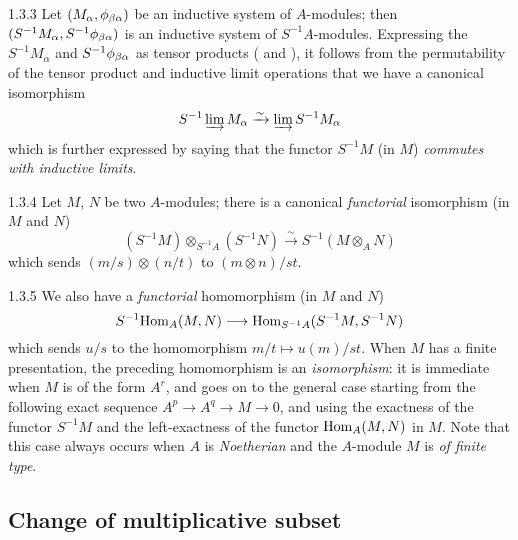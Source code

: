 \documentclass[10pt,oneside]{book}
\begin{document}
\begin{env}{1.3.3}
\label{env-0.1.3.3}
Let $(M_\alpha,\phi_{\beta\alpha})$ be an inductive system of $A$-modules; then
$(S^{-1}M_\alpha,S^{-1}\phi_{\beta\alpha})$ is an inductive system of $S^{-1}A$-modules.
Expressing the $S^{-1}M_\alpha$ and $S^{-1}\phi_{\beta\alpha}$ as tensor products
( and ), it follows from the permutability of the tensor product and
inductive limit operations that we have a canonical isomorphism
\[
  S^{-1}\varinjlim M_\alpha\xrightarrow{\sim}\varinjlim S^{-1}M_\alpha
\]
which is further expressed by saying that the functor $S^{-1}M$ (in $M$) \emph{commutes with
inductive limits}.
\end{env}

\begin{env}{1.3.4}
\label{env-0.1.3.4}
Let $M$, $N$ be two $A$-modules; there is a canonical \emph{functorial} isomorphism (in $M$
and $N$)
\[
  (S^{-1}M)\otimes_{S^{-1}A}(S^{-1}N)\xrightarrow{\sim}S^{-1}(M\otimes_A N)
\]
which sends $(m/s)\otimes(n/t)$ to $(m\otimes n)/st$.
\end{env}

\begin{env}{1.3.5}
\label{env-0.1.3.5}
We also have a \emph{functorial} homomorphism (in $M$ and $N$)
\[
  S^{-1}{\mathop{\mathrm{Hom}}\nolimits}_A(M,N)\longrightarrow{\mathop{\mathrm{Hom}}\nolimits}_{S^{-1}A}(S^{-1}M,S^{-1}N)
\]
which sends $u/s$ to the homomorphism $m/t\mapsto u(m)/st$. When $M$ has a finite
presentation, the preceding homomorphism is an \emph{isomorphism}: it is immediate when $M$
is of the form $A^r$, and goes on to the general case starting from the following exact
sequence $A^p\to A^q\to M\to 0$, and using the exactness of the functor $S^{-1}M$ and
the left-exactness of the functor ${\mathop{\mathrm{Hom}}\nolimits}_A(M,N)$ in $M$. Note that this case always occurs
when $A$ is \emph{Noetherian} and the $A$-module $M$ is \emph{of finite type}.
\end{env}

\subsection{Change of multiplicative subset}
\label{0-prelim-1.4}
\end{document}

